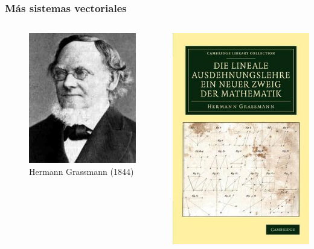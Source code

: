 \documentclass{beamer}
\begin{document}
\begin{frame}
    \frametitle{Más sistemas vectoriales}
    \begin{columns}
        \begin{center}
            \begin{figure}
            \includegraphics[scale=0.4]{../gfx/grassmann}
                \caption{Hermann Grassmann (1844)}
            \end{figure}
        \end{center}
        \includegraphics[width=\textwidth]{../gfx/grassmann-book}

\end{columns}
\end{frame}
\end{document}
